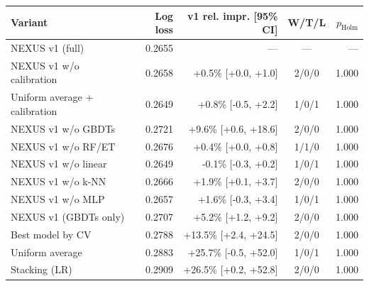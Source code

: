 \begin{tabular}{lrrcr}
\toprule
Variant & Log loss & v1 rel. impr. [95\% CI] & W/T/L & $p_\text{Holm}$\\
\midrule
NEXUS v1 (full) & 0.2655 & --- & --- & ---\\
NEXUS v1 w/o calibration & 0.2658 & +0.5\% [+0.0, +1.0] & 2/0/0 & 1.000\\
Uniform average + calibration & 0.2649 & +0.8\% [-0.5, +2.2] & 1/0/1 & 1.000\\
NEXUS v1 w/o GBDTs & 0.2721 & +9.6\% [+0.6, +18.6] & 2/0/0 & 1.000\\
NEXUS v1 w/o RF/ET & 0.2676 & +0.4\% [+0.0, +0.8] & 1/1/0 & 1.000\\
NEXUS v1 w/o linear & 0.2649 & -0.1\% [-0.3, +0.2] & 1/0/1 & 1.000\\
NEXUS v1 w/o k-NN & 0.2666 & +1.9\% [+0.1, +3.7] & 2/0/0 & 1.000\\
NEXUS v1 w/o MLP & 0.2657 & +1.6\% [-0.3, +3.4] & 1/0/1 & 1.000\\
NEXUS v1 (GBDTs only) & 0.2707 & +5.2\% [+1.2, +9.2] & 2/0/0 & 1.000\\
Best model by CV & 0.2788 & +13.5\% [+2.4, +24.5] & 2/0/0 & 1.000\\
Uniform average & 0.2883 & +25.7\% [-0.5, +52.0] & 1/0/1 & 1.000\\
Stacking (LR) & 0.2909 & +26.5\% [+0.2, +52.8] & 2/0/0 & 1.000\\
\bottomrule
\end{tabular}
